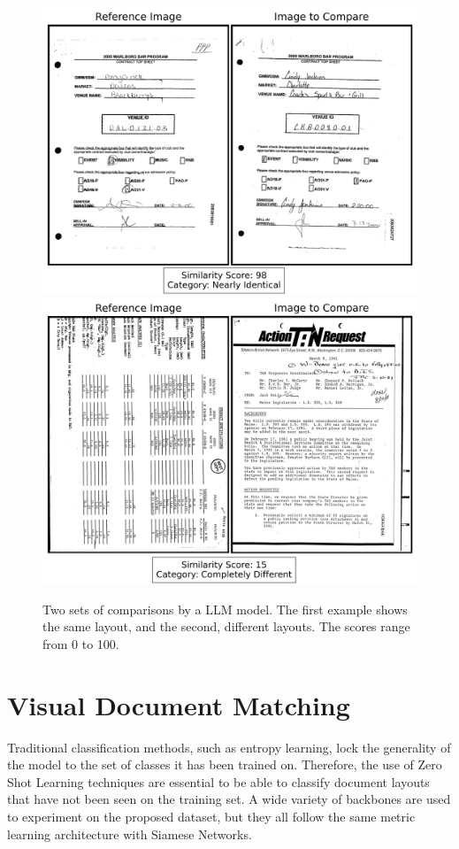 \begin{figure}[htbp]
    \centering
    \includegraphics[width=.8\linewidth]{images/similar.png}
    \\[1em]
    \centering
    \includegraphics[width=.8\linewidth]{images/different.png}
    \caption{Two sets of comparisons by a LLM model. The first example shows the same layout, and the second, different layouts. The scores range from 0 to 100.}
    \label{fig:document_comparison}
\end{figure}

\section{Visual Document Matching}
\label{sec:method_modeling}

Traditional classification methods, such as entropy learning, lock the generality of the model to the set of classes it has been trained on. Therefore, the use of Zero Shot Learning techniques are essential to be able to classify document layouts that have not been seen on the training set. A wide variety of backbones are used to experiment on the proposed dataset, but they all follow the same metric learning architecture with Siamese Networks.

